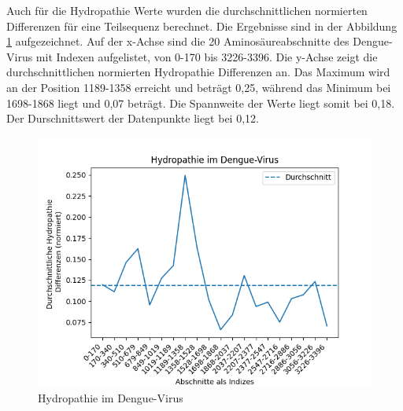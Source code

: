 \documentclass[german,version-2022-01]{uzl-thesis}
\begin{document}
Auch f\"ur die Hydropathie Werte wurden die durchschnittlichen normierten Differenzen f\"ur eine Teilsequenz berechnet. Die Ergebnisse sind in der Abbildung \ref{fig:Dengue_virus_hydropathy} aufgezeichnet. Auf der x-Achse sind die 20 Aminos\"aureabschnitte des Dengue-Virus mit Indexen aufgelistet, von 0-170 bis 3226-3396. Die y-Achse zeigt die durchschnittlichen normierten Hydropathie Differenzen an. Das Maximum wird an der Position 1189-1358 erreicht und betr\"agt 0,25, w\"ahrend das Minimum bei 1698-1868 liegt und 0,07 betr\"agt. Die Spannweite der Werte liegt somit bei 0,18. Der Durschnittswert der Datenpunkte liegt bei 0,12.
\begin{figure}[tbp]
  \centering
  \includegraphics[scale=0.75]{Images/Diagramm_Hydropathie_im_Dengue_virus.png}
  \caption{Hydropathie im Dengue-Virus}
  \label{fig:Dengue_virus_hydropathy}
\end{figure}
\end{document}
